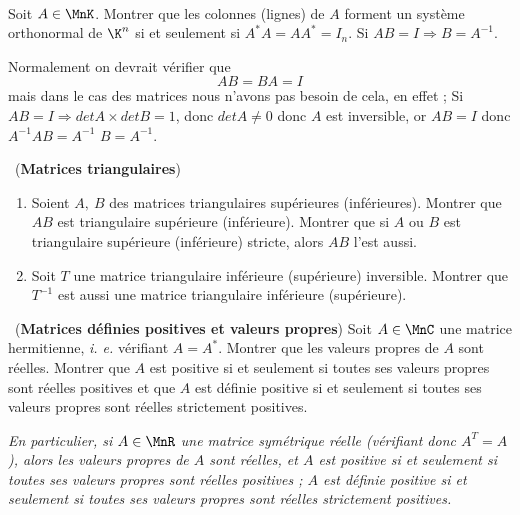 \begin{exo}\ \\
  Soit $A\in\MnK$. Montrer que les colonnes (lignes) de $A$ forment un système orthonormal de $\K^n$ si et seulement si $A^*A=AA^*=I_n$.
	\bn
	Si $AB = I \Rightarrow B = A^{-1}$.

	Normalement on devrait vérifier que $$AB = BA = I$$ mais dans le cas des matrices nous n'avons pas besoin de cela, en effet ; Si $AB = I \Rightarrow det A \times det B = 1$, donc $det A \ne 0$ donc $A$ est inversible, or $AB = I$ donc $A^{-1} A B = A^{-1}$ \ie $B = A^{-1}$.
	\en

\end{exo}


\begin{exo}\ ({\bf Matrices triangulaires})
  \begin{enumerate}
\item Soient $A,\ B$ des matrices triangulaires supérieures (inférieures). Montrer que $AB$ est triangulaire supérieure (inférieure). Montrer que si $A$ ou $B$ est triangulaire supérieure (inférieure) stricte, alors $AB$ l'est aussi.
\item Soit $T$ une matrice triangulaire inférieure (supérieure) inversible. Montrer que $T^{-1}$ est aussi une matrice triangulaire inférieure (supérieure).
\end{enumerate}
\end{exo}


\begin{exo}\ ({\bf Matrices définies positives et valeurs propres})
      Soit $A\in\MnC$ une matrice hermitienne, {\it i. e.} vérifiant $A=A^*$. Montrer que les valeurs propres de $A$ sont réelles. Montrer que $A$ est positive si et seulement si toutes ses valeurs propres sont réelles positives et que $A$ est définie positive si et seulement si toutes ses valeurs propres sont réelles strictement positives.

      {\it En particulier, si $A\in\MnR$ une matrice symétrique réelle (vérifiant donc $A^T=A$), alors les valeurs propres de $A$ sont réelles, et $A$ est positive si et seulement si toutes ses valeurs propres sont réelles positives ; $A$ est définie positive si et seulement si toutes ses valeurs propres sont réelles strictement positives.}
\end{exo}

